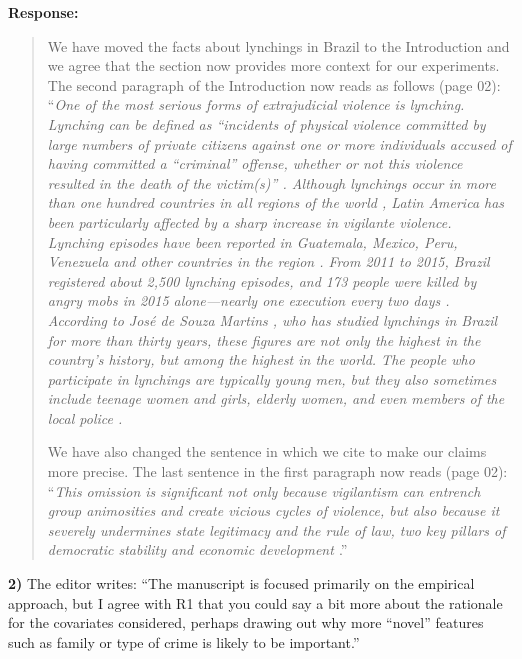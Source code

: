 \documentclass[a4paper,12pt]{article}
\begin{document}
\noindent \textbf{Response:} 
\begin{quote}

We have moved the facts about lynchings in Brazil to the Introduction and we
agree that the section now provides more context for our experiments. The
second paragraph of the Introduction now reads as follows (page 02):
``\textit{One of the most serious forms of extrajudicial violence is lynching.
  Lynching can be defined as ``incidents of physical violence committed by
  large numbers of private citizens against one or more individuals accused of
  having committed a ``criminal'' offense, whether or not this violence
  resulted in the death of the victim(s)'' \citep[645]{godoy2004justice}.
  Although lynchings occur in more than one hundred countries in all regions of
  the world \citep{jung2020lynching,smith2019contradictions}, Latin America has
  been particularly affected by a sharp increase in vigilante violence.
  Lynching episodes have been reported in Guatemala, Mexico, Peru, Venezuela
  and other countries in the region \citep{barbara2015vigilantes,
  cruz2019determinants, godoy2004justice}. From 2011 to 2015, Brazil registered
  about 2,500 lynching episodes, and 173 people were killed by angry mobs in
  2015 alone---nearly one execution every two days
  \citep{barbara2015vigilantes, oliveira2016mob}. According to José de Souza
  Martins \citeyearpar{martins2015linchamentos}, who has studied lynchings in
  Brazil for more than thirty years, these figures are not only the highest in
  the country's history, but among the highest in the world. The people who
participate in lynchings are typically young men, but they also sometimes
include teenage women and girls, elderly women, and even members of the local
police \citep{moura2017linchamentos}.}

We have also changed the sentence in which we cite \citet{blair2017predicting}
to make our claims more precise. The last sentence in the first paragraph now
reads (page 02): ``\textit{This omission is significant not only because
  vigilantism can entrench group animosities and create vicious cycles of
violence, but also because it severely undermines state legitimacy and the rule
of law, two key pillars of democratic stability and economic development
\citep{jung2020lynching, tankebe2009self}}.''

\end{quote}

\vspace{.3cm}

\noindent \textbf{2)} The editor writes: ``The manuscript is focused primarily
on the empirical approach, but I agree with R1 that you could say a bit more
about the rationale for the covariates considered, perhaps drawing out why more
``novel'' features such as family or type of crime is likely to be important.'' 
\end{document}
